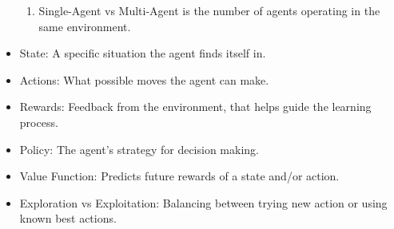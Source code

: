 \begin{itemize}
\begin{enumerate}
            \item Single-Agent vs Multi-Agent is the number of agents operating in the same environment.
        \end{enumerate}
    \item State: A specific situation the agent finds itself in.
    \item Actions: What possible moves the agent can make.
    \item Rewards: Feedback from the environment, that helps guide the learning process.
    \item Policy: The agent's strategy for decision making.
    \item Value Function: Predicts future rewards of a state and/or action.
    \item Exploration vs Exploitation: Balancing between trying new action or using known best actions.
\end{itemize}

